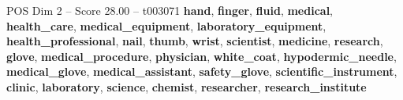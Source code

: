 \begin{textsample}{POS Dim 2 – Score 28.00 – t003071}  \label{ex:f2_pos_026}
\textbf{hand}, \textbf{finger}, \textbf{fluid}, \textbf{medical}, \textbf{health\_care}, \textbf{medical\_equipment}, \textbf{laboratory\_equipment}, \textbf{health\_professional}, \textbf{nail}, \textbf{thumb}, \textbf{wrist}, \textbf{scientist}, \textbf{medicine}, \textbf{research}, \textbf{glove}, \textbf{medical\_procedure}, \textbf{physician}, \textbf{white\_coat}, \textbf{hypodermic\_needle}, \textbf{medical\_glove}, \textbf{medical\_assistant}, \textbf{safety\_glove}, \textbf{scientific\_instrument}, \textbf{clinic}, \textbf{laboratory}, \textbf{science}, \textbf{chemist}, \textbf{researcher}, \textbf{research\_institute}

\end{textsample}

